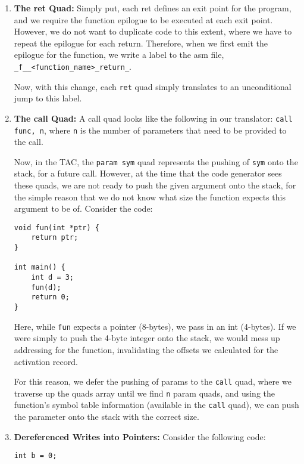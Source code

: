 \documentclass{article}
\begin{document}
{{		\begin{enumerate}
			\item \textbf{The ret Quad:} Simply put, each ret defines an exit point for the program, and we require the function epilogue to be executed at each exit point. However, we do not want to duplicate code to this extent, where we have to repeat the epilogue for each return. Therefore, when we first emit the epilogue for the function, we write a label to the asm file, \verb|_f__<function_name>_return_|.\bigskip
			
			Now, with this change, each \verb|ret| quad simply translates to an unconditional jump to this label.
			\item \textbf{The call Quad:} A call quad looks like the following in our translator: \verb|call func, n|, where \verb|n| is the number of parameters that need to be provided to the call.\bigskip
			
			Now, in the TAC, the \verb|param sym| quad represents the pushing of \verb|sym| onto the stack, for a future call. However, at the time that the code generator sees these quads, we are not ready to push the given argument onto the stack, for the simple reason that we do not know what size the function expects this argument to be of. Consider the code:
			\begin{verbatim}
void fun(int *ptr) {
    return ptr;
}

int main() {
    int d = 3;
    fun(d);
    return 0;
}
			\end{verbatim}
			Here, while \verb|fun| expects a pointer (8-bytes), we pass in an int (4-bytes). If we were simply to push the 4-byte integer onto the stack, we would mess up addressing for the function, invalidating the offsets we calculated for the activation record.\bigskip

			For this reason, we defer the pushing of params to the \verb|call| quad, where we traverse up the quads array until we find \verb|n| param quads, and using the function's symbol table information (available in the \verb|call| quad), we can push the parameter onto the stack with the correct size.
		
			\item \textbf{Dereferenced Writes into Pointers:} Consider the following code:
\begin{verbatim}
int b = 0;


\end{verbatim}
\end{enumerate}}}
\end{document}

